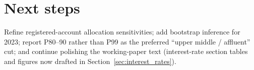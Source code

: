 \documentclass[11pt]{article}
\begin{document}
\section{Next steps}

Refine registered-account allocation sensitivities; add bootstrap inference for 2023; report P80--90 rather than P99 as the preferred ``upper middle / affluent'' cut; and continue polishing the working-paper text (interest-rate section tables and figures now drafted in Section~\ref{sec:interest_rates}).


\end{document}
